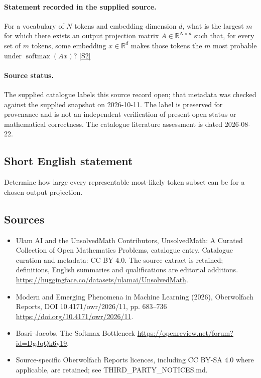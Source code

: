 \documentclass[11pt]{article}
\begin{document}
\paragraph{Statement recorded in the supplied source.}
For a vocabulary of $N$ tokens and embedding dimension $d$, what is the largest $m$ for which there exists an output projection matrix $A\in\mathbb R^{N\times d}$ such that, for every set of $m$ tokens, some embedding $x\in\mathbb R^d$ makes those tokens the $m$ most probable under $\operatorname{softmax}(Ax)$? \href{https://doi.org/10.4171/owr/2026/11}{[S2]}
\paragraph{Source status.}
The supplied catalogue labels this source record open; that metadata was checked against the supplied snapshot on 2026-10-11. The label is preserved for provenance and is not an independent verification of present open status or mathematical correctness. The catalogue literature assessment is dated 2026-08-22.
\subsection{Short English statement}
Determine how large every representable most-likely token subset can be for a chosen output projection.
\subsection{Sources}
\begin{itemize}
\item[S1] Ulam AI and the UnsolvedMath Contributors, UnsolvedMath: A Curated Collection of Open Mathematics Problems, catalogue entry. Catalogue curation and metadata: CC BY 4.0. The source extract is retained; definitions, English summaries and qualifications are editorial additions.
\url{https://huggingface.co/datasets/ulamai/UnsolvedMath}.
\item[S2] Modern and Emerging Phenomena in Machine Learning (2026), Oberwolfach Reports, DOI 10.4171/owr/2026/11, pp. 683--736
\url{https://doi.org/10.4171/owr/2026/11}.
\item[S3] Basri--Jacobs, The Softmax Bottleneck
\url{https://openreview.net/forum?id=DgJqQk6y19}.
\item Source-specific Oberwolfach Reports licences, including CC BY-SA 4.0 where applicable, are retained; see THIRD\_PARTY\_NOTICES.md.
\end{itemize}
\end{document}
